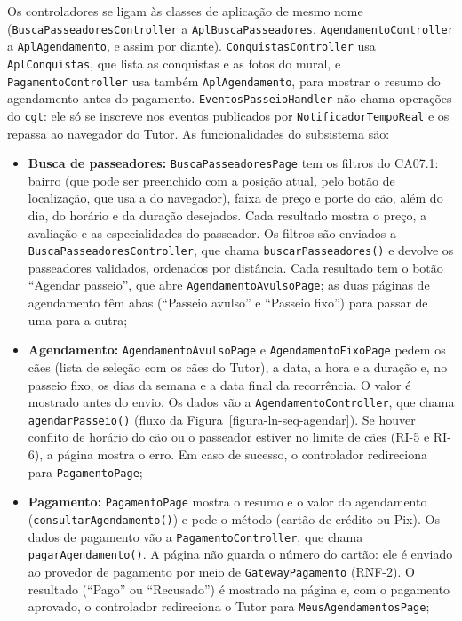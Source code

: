 \begin{sloppypar}
Os controladores se ligam às classes de aplicação de mesmo nome (\texttt{BuscaPasseadoresController} a \texttt{AplBuscaPasseadores}, \texttt{AgendamentoController} a \texttt{AplAgendamento}, e assim por diante). \texttt{ConquistasController} usa \texttt{AplConquistas}, que lista as conquistas e as fotos do mural, e \texttt{PagamentoController} usa também \texttt{AplAgendamento}, para mostrar o resumo do agendamento antes do pagamento. \texttt{EventosPasseioHandler} não chama operações do \texttt{cgt}: ele só se inscreve nos eventos publicados por \texttt{NotificadorTempoReal} e os repassa ao navegador do Tutor. As funcionalidades do subsistema são:
\end{sloppypar}

\begin{sloppypar}
\begin{itemize}
	\item \textbf{Busca de passeadores:} \texttt{BuscaPasseadoresPage} tem os filtros do CA07.1: bairro (que pode ser preenchido com a posição atual, pelo botão de localização, que usa a do navegador), faixa de preço e porte do cão, além do dia, do horário e da duração desejados. Cada resultado mostra o preço, a avaliação e as especialidades do passeador. Os filtros são enviados a \texttt{BuscaPasseadoresController}, que chama \texttt{buscarPasseadores()} e devolve os passeadores validados, ordenados por distância. Cada resultado tem o botão ``Agendar passeio'', que abre \texttt{AgendamentoAvulsoPage}; as duas páginas de agendamento têm abas (``Passeio avulso'' e ``Passeio fixo'') para passar de uma para a outra;
	\item \textbf{Agendamento:} \texttt{AgendamentoAvulsoPage} e \texttt{AgendamentoFixoPage} pedem os cães (lista de seleção com os cães do Tutor), a data, a hora e a duração e, no passeio fixo, os dias da semana e a data final da recorrência. O valor é mostrado antes do envio. Os dados vão a \texttt{AgendamentoController}, que chama \texttt{agendarPasseio()} (fluxo da Figura~\ref{figura-ln-seq-agendar}). Se houver conflito de horário do cão ou o passeador estiver no limite de cães (RI-5 e RI-6), a página mostra o erro. Em caso de sucesso, o controlador redireciona para \texttt{PagamentoPage};
	\item \textbf{Pagamento:} \texttt{PagamentoPage} mostra o resumo e o valor do agendamento (\texttt{consultarAgendamento()}) e pede o método (cartão de crédito ou Pix). Os dados de pagamento vão a \texttt{PagamentoController}, que chama \texttt{pagarAgendamento()}. A página não guarda o número do cartão: ele é enviado ao provedor de pagamento por meio de \texttt{GatewayPagamento} (RNF-2). O resultado (``Pago'' ou ``Recusado'') é mostrado na página e, com o pagamento aprovado, o controlador redireciona o Tutor para \texttt{MeusAgendamentosPage};

\end{itemize}
\end{sloppypar}
